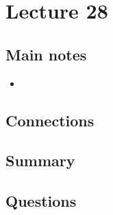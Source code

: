 \section{Lecture 28}
\subsection{Main notes}


\begin{itemize}
	\item
\end{itemize}


\subsection{Connections}


\subsection{Summary}


\subsection{Questions}
